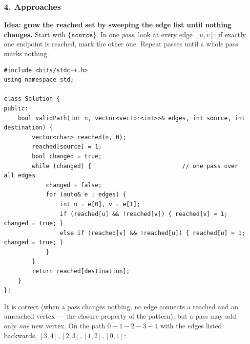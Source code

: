 \subsubsection*{4. Approaches}

\begin{bruteforcebox}
\textbf{Idea: grow the reached set by sweeping the edge list until nothing changes.} Start with $\{\texttt{source}\}$. In one \emph{pass}, look at every edge $[u,v]$: if exactly one endpoint is reached, mark the other one. Repeat passes until a whole pass marks nothing.

\begin{lstlisting}[style=cpp]
#include <bits/stdc++.h>
using namespace std;

class Solution {
public:
    bool validPath(int n, vector<vector<int>>& edges, int source, int destination) {
        vector<char> reached(n, 0);
        reached[source] = 1;
        bool changed = true;
        while (changed) {                          // one pass over all edges
            changed = false;
            for (auto& e : edges) {
                int u = e[0], v = e[1];
                if (reached[u] && !reached[v]) { reached[v] = 1; changed = true; }
                else if (reached[v] && !reached[u]) { reached[u] = 1; changed = true; }
            }
        }
        return reached[destination];
    }
};
\end{lstlisting}

It is correct (when a pass changes nothing, no edge connects a reached and an unreached vertex --- the closure property of the pattern), but a pass may add only \emph{one} new vertex. On the path $0-1-2-3-4$ with the edges listed backwards, $[3,4], [2,3], [1,2], [0,1]$:

\begin{center}
\end{center}


\end{bruteforcebox}
